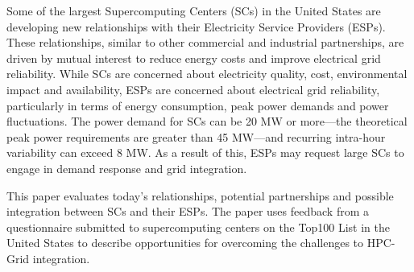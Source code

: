 Some of the largest Supercomputing Centers (SCs) in the United States are developing new relationships with their Electricity Service Providers (ESPs). These relationships, similar to other commercial and industrial partnerships, are driven by mutual interest to reduce energy costs and improve electrical grid reliability. While SCs are concerned about electricity quality, cost, environmental impact and availability, ESPs are concerned about electrical grid reliability, particularly in terms of energy consumption, peak power demands and power fluctuations. The power demand for SCs can be 20 MW or more---the theoretical peak power requirements are greater than 45 MW---and recurring intra-hour variability can exceed 8 MW. As a result of this, ESPs may request large SCs to engage in demand response and grid integration. 

This paper evaluates today's relationships, potential partnerships and possible integration between SCs and their ESPs. The paper uses feedback from a questionnaire submitted to supercomputing centers on the Top100 List in the United States to describe opportunities for overcoming the challenges to HPC-Grid integration. \\ 

%
%
%
%
%
%
